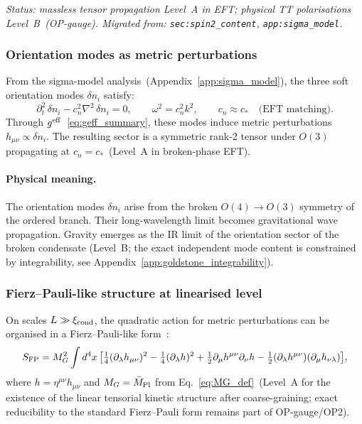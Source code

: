 \documentclass[11pt,a4paper]{article}
\numberwithin{equation}{section}
\begin{document}
\textit{Status: massless tensor propagation Level~A in EFT;
physical TT polarisations Level~B~(OP-gauge).
Migrated from: \texttt{sec:spin2\_content}, \texttt{app:sigma\_model}.}

\subsubsection*{Orientation modes as metric perturbations}

From the sigma-model analysis~(Appendix~\ref{app:sigma_model}),
the three soft orientation modes $\delta n_i$ satisfy:
\begin{equation}
  \label{eq:n_eom_macro}
  \partial_t^2\,\delta n_i - c_n^2\nabla^2\,\delta n_i = 0,
  \qquad \omega^2 = c_n^2 k^2,
  \qquad c_n\approx c_*
  \quad\text{(EFT matching)}.
\end{equation}
Through $g^{\rm eff}$~\eqref{eq:geff_summary}, these modes
induce metric perturbations $h_{\mu\nu}\propto\delta n_i$.
The resulting sector is a symmetric rank-2 tensor under $O(3)$
propagating at $c_n=c_*$~(Level~A in broken-phase EFT).

\paragraph{Physical meaning.}
The orientation modes $\delta n_i$ arise from the broken $O(4)\to O(3)$
symmetry of the ordered branch.
Their long-wavelength limit becomes gravitational wave propagation.
Gravity emerges as the IR limit of the orientation sector of the broken
condensate (Level~B; the exact independent mode content is constrained
by integrability, see Appendix~\ref{app:goldstone_integrability}).

\subsubsection*{Fierz--Pauli-like structure at linearised level}

On scales $L\gg\xi_{\rm cond}$, the quadratic action for metric perturbations can be organised
in a Fierz--Pauli-like form~\cite{Fierz1939}:
\begin{align}
  \label{eq:FP_action}
  S_{\rm FP} = M_G^2\int d^4x\,\bigl[
    \tfrac{1}{4}(\partial_\lambda h_{\mu\nu})^2
    - \tfrac{1}{4}(\partial_\lambda h)^2
    + \tfrac{1}{2}\partial_\mu h^{\mu\nu}\partial_\nu h
    - \tfrac{1}{2}(\partial_\lambda h^{\mu\nu})(\partial_\mu h_{\nu\lambda})
  \bigr],
\end{align}
where $h=\eta^{\mu\nu}h_{\mu\nu}$ and $M_G=\bar M_{\rm Pl}$
from Eq.~\eqref{eq:MG_def}~(Level~A for the existence of the linear tensorial kinetic structure
after coarse-graining; exact reducibility to the standard
Fierz--Pauli form remains part of OP-gauge/OP2).
\end{document}
